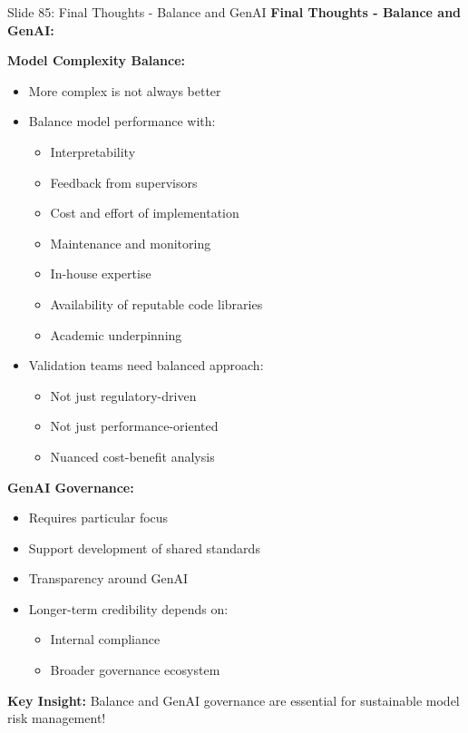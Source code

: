 \documentclass[8pt]{beamer}
\begin{document}
	\begin{frame}{Slide 85: Final Thoughts - Balance and GenAI}
		\fontsize{6.5}{7.5}\selectfont
		\textbf{Final Thoughts - Balance and GenAI:}
		
		\vspace{0.1cm}
		\textbf{Model Complexity Balance:}
		\begin{itemize}
			\item More complex is not always better
			\item Balance model performance with:
			\begin{itemize}
				\item Interpretability
				\item Feedback from supervisors
				\item Cost and effort of implementation
				\item Maintenance and monitoring
				\item In-house expertise
				\item Availability of reputable code libraries
				\item Academic underpinning
			\end{itemize}
			\item Validation teams need balanced approach:
			\begin{itemize}
				\item Not just regulatory-driven
				\item Not just performance-oriented
				\item Nuanced cost-benefit analysis
			\end{itemize}
		\end{itemize}
		
		\vspace{0.1cm}
		\textbf{GenAI Governance:}
		\begin{itemize}
			\item Requires particular focus
			\item Support development of shared standards
			\item Transparency around GenAI
			\item Longer-term credibility depends on:
			\begin{itemize}
				\item Internal compliance
				\item Broader governance ecosystem
			\end{itemize}
		\end{itemize}
		
		\textcolor{myblue}{\textbf{Key Insight:}} Balance and GenAI governance are \textcolor{myblue}{essential for sustainable model risk management}!
	\end{frame}
	
\end{document}
